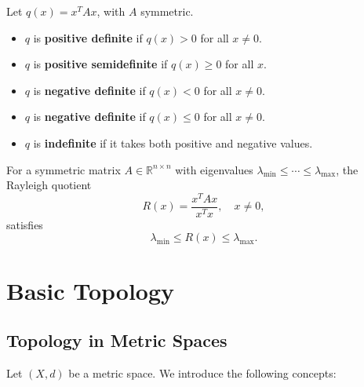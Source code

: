 \begin{definition}
Let $q(x) = x^T A x$, with $A$ symmetric.
\begin{itemize}
    \item $q$ is \textbf{positive definite} if $q(x) > 0$ for all $x \neq 0$.
    \item $q$ is \textbf{positive semidefinite} if $q(x) \geq 0$ for all $x$.
    \item $q$ is \textbf{negative definite} if $q(x) < 0$ for all $x \neq 0$.
    \item $q$ is \textbf{negative definite} if $q(x) \leq 0$ for all $x \neq 0$.
    \item $q$ is \textbf{indefinite} if it takes both positive and negative values.
\end{itemize}
\end{definition}

\begin{theorem}
For a symmetric matrix $A \in \mathbb{R}^{n \times n}$ with eigenvalues $\lambda_{\min} \leq \cdots \leq \lambda_{\max}$,  
the Rayleigh quotient
\[
R(x) = \frac{x^T A x}{x^T x}, \quad x \neq 0,
\]
satisfies
\[
\lambda_{\min} \leq R(x) \leq \lambda_{\max}.
\]
\end{theorem}

\section{Basic Topology}

\subsection{Topology in Metric Spaces}

Let $(X,d)$ be a metric space. We introduce the following concepts:

